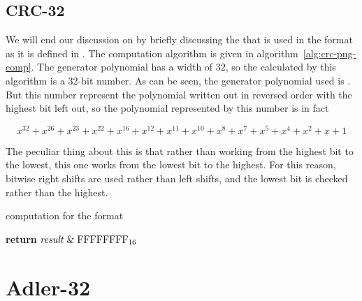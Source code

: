 \subsection{CRC-32}
\label{sec:pngcrc}

We will end our discussion on \crc by briefly discussing the \crc that
is used in the \png format as it is defined in
\cite{boutel:_png_portab_networ_graph_specif_version12}. The \crc
computation algorithm is given in
algorithm~\ref{alg:crc-png-comp}. The generator polynomial has a width
of $32$, so the \crc calculated by this algorithm is a 32-bit
number. As can be seen, the generator polynomial used is
. But this number represent the polynomial written out
in reversed order with the highest bit left out, so the polynomial
represented by this number is in fact

\begin{equation*}
  x^{32} + x^{26} + x^{23} + x^{22} + x^{16} + x^{12} + x^{11} + x^{10} + x^8 + x^7 + x^5 + x^4 + x^2 + x + 1
\end{equation*}

The peculiar thing about this \crc is that rather than working from the
highest bit to the lowest, this one works from the lowest bit to the
highest. For this reason, bitwise right shifts are used rather than
left shifts, and the lowest bit is checked rather than the
highest.

\begin{algorithm}[H]
  \caption{\crc computation for the \png format}
  \label{alg:crc-png-comp}
  \begin{algorithmic}[1]


    \Else
    \EndIf
    \EndRepeatn

    \EndForEach

    \State \textbf{return}  $\mathit{result} \mathrel{\&} \mbox{\ensuremath{\mathrm{FFFFFFFF}_{16}}}$
    \EndProcedure

  \end{algorithmic}
\end{algorithm}


\section{Adler-32}
\label{sec:adler32}

